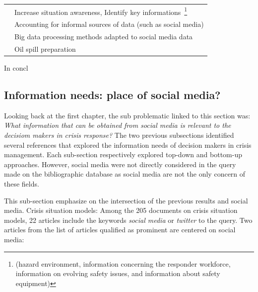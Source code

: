 \begin{table}[bp]
\begin{tabular}{m{} m{}}
        \cite{yangDesignPrinciplesIntegrated2012a}                   & Increase situation awareness, Identify key informations~\footnote{(hazard environment, information concerning the responder workforce, information on evolving safety issues, and information about safety equipment)} \\
        \cite{tapiaTrustworthyTweetDeeper2013a}                      & Accounting for informal sources of data (such as social media)                                                                                                                                                         \\
        \cite{cobbDesigningDelugeUnderstanding2014a}                 & Big data processing methods adapted to social media data                                                                                                                                                               \\
        \cite{cabreraaguileraModellingPerformanceVariabilities2016a} & Oil spill preparation                                                                                                                                                                                                  \\
        \bottomrule
    \end{tabular}
    \label{table:business-needs-main-articles}
\end{table}

In concl

\subsection{Information needs: place of social media?}
Looking back at the first chapter, the sub problematic linked to this section was: \emph{What information that can be obtained from social media is relevant to the decisiom makers in crisis response?}
The two previous subsections identified several references that explored the information needs of decision makers in crisis management.
Each sub-section respectively explored top-down and bottom-up approaches.
However, social media were not directly considered in the query made on the bibliographic database as social media are not the only concern of these fields.

This sub-section emphasize on the intersection of the previous results and social media.
Crisis situation models:
Among the 205 documents on crisis situation models, 22 articles include the keywords \emph{social media} or \emph{twitter} to the query.
Two articles from the list of articles qualified as prominent are centered on social media:

